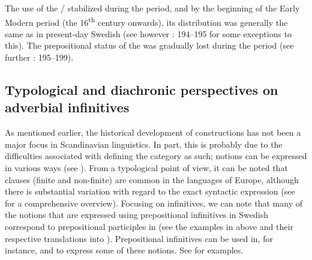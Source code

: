 \documentclass[output=paper]{langscibook}
\begin{document}
The use of the / stabilized during the  period, and by the beginning of the Early Modern period (the 16\textsuperscript{th} century onwards), its distribution was generally the same as in present-day Swedish (see however \citealt{Hellquist1902}: 194–195 for some exceptions to this). The prepositional status of the  was gradually lost during the  period (see further \citealt{Kalm2016Satsekvivalenta}: 195–199). 


\subsection{Typological and diachronic perspectives on adverbial infinitives}\label{sec:kalm:3.2}

As mentioned earlier, the historical development of  constructions has not been a major focus in Scandinavian linguistics. In part, this is probably due to the difficulties associated with defining the  category as such;  notions can be expressed in various ways (see \citealt[3]{Van_der_auwera1998}). From a typological point of view, it can be noted that  clauses (finite and non-finite) are common in the languages of Europe, although there is substantial variation with regard to the exact syntactic expression (see \citealt{Hengenveld1998} for a comprehensive overview). Focusing on  infinitives, we can note that many of the  notions that are expressed using prepositional infinitives in Swedish correspond to prepositional participles in  (see the examples in  above and their respective translations into ). Prepositional infinitives can be used in, for instance,  and  to express some of these notions. See  for examples. 
\end{document}
